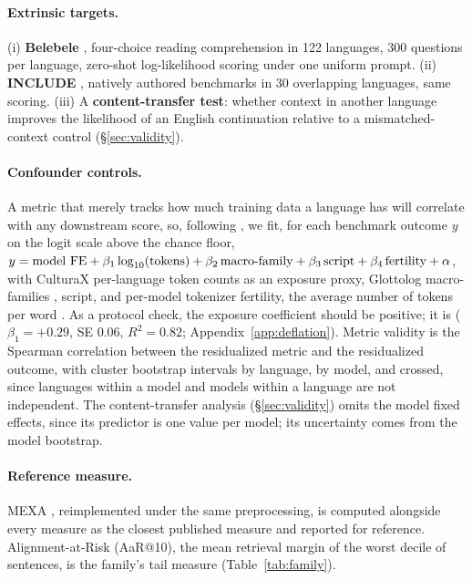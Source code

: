 \documentclass{article} %
\begin{document}
\paragraph{Extrinsic targets.} (i) \textbf{Belebele} \citep{bandarkar2024belebele},
four-choice reading comprehension in 122 languages, 300 questions per language, zero-shot log-likelihood scoring under one uniform prompt.
(ii) \textbf{INCLUDE} \citep{romanou2024include}, natively authored benchmarks in 30 overlapping languages, same scoring. (iii) A \textbf{content-transfer test}: whether context in another language improves the likelihood of an English continuation relative to a mismatched-context control (\S\ref{sec:validity}).

\paragraph{Confounder controls.} A metric that merely tracks how much training data a language has will correlate with any downstream score, so, following \citet{lin2019langrank,xia2020nlperf}, we fit, for each benchmark outcome $y$ on the logit scale above the chance floor,
$y = \text{model FE} + \beta_1 \log_{10}(\text{tokens}) + \beta_2\,\text{macro\mbox{-}family} + \beta_3\,\text{script} + \beta_4\,\text{fertility} + \alpha$,
with CulturaX per-language token counts \citep{nguyen2023culturax} as an exposure proxy, Glottolog macro-families \citep{hammarstrom2024glottolog}, script, and per-model tokenizer fertility, the average number of tokens per word \citep{ahia2023costs,petrov2023tokenizers}.
As a protocol check, the exposure coefficient should be positive; it is ($\beta_1 = +0.29$, SE $0.06$, $R^2 = 0.82$; Appendix~\ref{app:deflation}). Metric validity is the Spearman correlation between the
residualized metric and the residualized outcome, with cluster bootstrap
intervals by language, by model, and crossed, since languages within a model
and models within a language are not independent. The content-transfer analysis (\S\ref{sec:validity}) omits the model fixed effects, since its predictor is one value per model; its uncertainty comes from the model bootstrap.

\paragraph{Reference measure.} MEXA \citep{kargaran2024mexa}, reimplemented under the same preprocessing, is computed alongside every measure as the closest published measure and reported for reference. Alignment-at-Risk (AaR@10), the mean retrieval margin of the worst decile of sentences, is the family's tail measure (Table~\ref{tab:family}).
\end{document}
